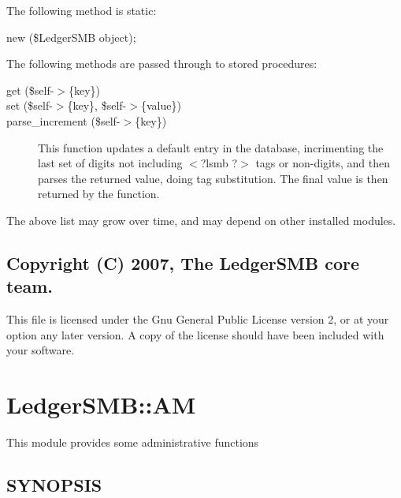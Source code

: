 \begin{description}
\begin{description}
\begin{description}
\begin{description}
\begin{description}
\begin{description}
The following method is static:

\begin{description}

\item[{new (\$LedgerSMB object);}] \mbox{}\end{description}


The following methods are passed through to stored procedures:

\begin{description}

\item[{get (\$self-$>$\{key\})}] \mbox{}
\item[{set (\$self-$>$\{key\}, \$self-$>$\{value\})}] \mbox{}
\item[{parse\_increment (\$self-$>$\{key\})}] \mbox{}

This function updates a default entry in the database, incrimenting the last 
set of digits not including $<$?lsmb ?$>$ tags or non-digits, and then parses the 
returned value, doing tag substitution.  The final value is then returned by 
the function.

\end{description}


The above list may grow over time, and may depend on other installed modules.

\subsection*{Copyright (C) 2007, The LedgerSMB core team.\label{LedgerSMB::Setting_Copyright_C_2007_The_LedgerSMB_core_team_}}


This file is licensed under the Gnu General Public License version 2, or at your
option any later version.  A copy of the license should have been included with
your software.

\section{LedgerSMB::AM\label{LedgerSMB::AM}}


This module provides some administrative functions

\subsection*{SYNOPSIS\label{LedgerSMB::AM_SYNOPSIS}}



\end{description}
\end{description}
\end{description}
\end{description}
\end{description}
\end{description}
